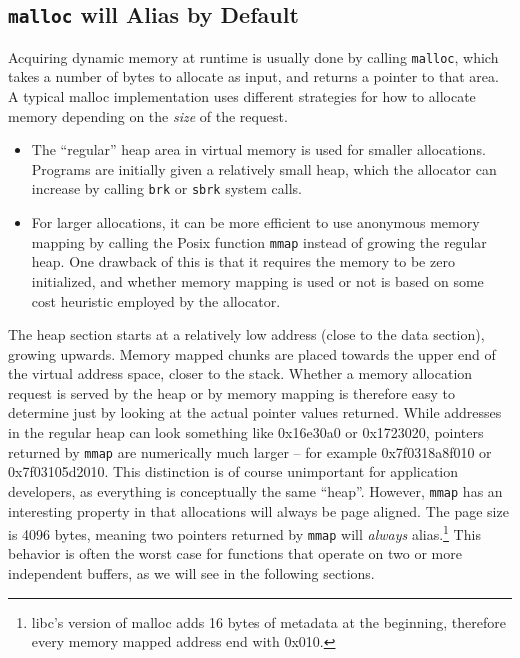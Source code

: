 \documentclass[prodmode,acmtaco]{acmsmall}
\begin{document}
{\subsection{\texttt{malloc} will Alias by Default}
Acquiring dynamic memory at runtime is usually done by calling \texttt{malloc}, which takes a number of bytes to allocate as input, and returns a pointer to that area.
A typical malloc implementation uses different strategies for how to allocate memory depending on the \emph{size} of the request.
\begin{itemize}
  \item The ``regular'' heap area in virtual memory is used for smaller allocations. 
  Programs are initially given a relatively small heap, which the allocator can increase by calling \texttt{brk} or \texttt{sbrk} system calls.

  \item For larger allocations, it can be more efficient to use anonymous memory mapping by calling the Posix function \texttt{mmap} instead of growing the regular heap.
  One drawback of this is that it requires the memory to be zero initialized, and whether memory mapping is used or not is based on some cost heuristic employed by the allocator.
\end{itemize}
The heap section starts at a relatively low address (close to the data section), growing upwards.
Memory mapped chunks are placed towards the upper end of the virtual address space, closer to the stack.
Whether a memory allocation request is served by the heap or by memory mapping is therefore easy to determine just by looking at the actual pointer values returned.
While addresses in the regular heap can look something like 0x16e30a0 or 0x1723020, pointers returned by \texttt{mmap} are numerically much larger -- for example 0x7f0318a8f010 or 0x7f03105d2010.
This distinction is of course unimportant for application developers, as everything is conceptually the same ``heap''.
However, \texttt{mmap} has an interesting property in that allocations will always be page aligned.
The page size is 4096 bytes, meaning two pointers returned by \texttt{mmap} will \emph{always} alias.\footnote{libc's version of malloc adds 16 bytes of metadata at the beginning, therefore every memory mapped address end with 0x010.}
This behavior is often the worst case for functions that operate on two or more independent buffers, as we will see in the following sections.


}
\end{document}
